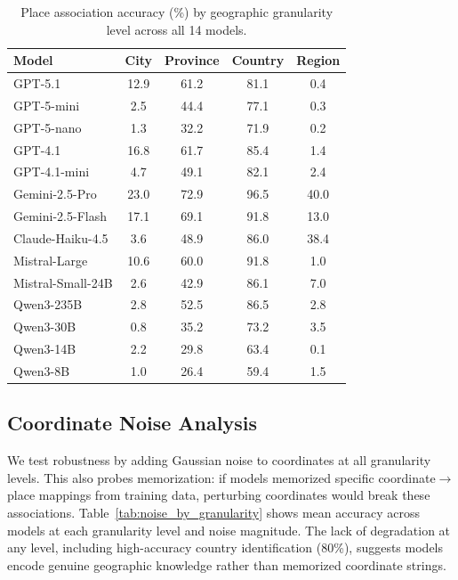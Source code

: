 \begin{table}[htbp]
\centering
\caption{Place association accuracy (\%) by geographic granularity level across all 14 models.}
\label{tab:place_assoc_granularity}
\small
\begin{tabular}{lcccc}
\toprule
\textbf{Model} & \textbf{City} & \textbf{Province} & \textbf{Country} & \textbf{Region} \\
\midrule
GPT-5.1 & 12.9 & 61.2 & 81.1 & 0.4 \\
GPT-5-mini & 2.5 & 44.4 & 77.1 & 0.3 \\
GPT-5-nano & 1.3 & 32.2 & 71.9 & 0.2 \\
GPT-4.1 & 16.8 & 61.7 & 85.4 & 1.4 \\
GPT-4.1-mini & 4.7 & 49.1 & 82.1 & 2.4 \\
\midrule
Gemini-2.5-Pro & 23.0 & 72.9 & 96.5 & 40.0 \\
Gemini-2.5-Flash & 17.1 & 69.1 & 91.8 & 13.0 \\
\midrule
Claude-Haiku-4.5 & 3.6 & 48.9 & 86.0 & 38.4 \\
\midrule
Mistral-Large & 10.6 & 60.0 & 91.8 & 1.0 \\
Mistral-Small-24B & 2.6 & 42.9 & 86.1 & 7.0 \\
\midrule
Qwen3-235B & 2.8 & 52.5 & 86.5 & 2.8 \\
Qwen3-30B & 0.8 & 35.2 & 73.2 & 3.5 \\
Qwen3-14B & 2.2 & 29.8 & 63.4 & 0.1 \\
Qwen3-8B & 1.0 & 26.4 & 59.4 & 1.5 \\
\bottomrule
\end{tabular}
\end{table}

\subsection{Coordinate Noise Analysis}
\label{app:noise_analysis}

We test robustness by adding Gaussian noise to coordinates at all granularity levels. This also probes memorization: if models memorized specific coordinate$\rightarrow$place mappings from training data, perturbing coordinates would break these associations. Table~\ref{tab:noise_by_granularity} shows mean accuracy across models at each granularity level and noise magnitude. The lack of degradation at any level, including high-accuracy country identification (80\%), suggests models encode genuine geographic knowledge rather than memorized coordinate strings.


